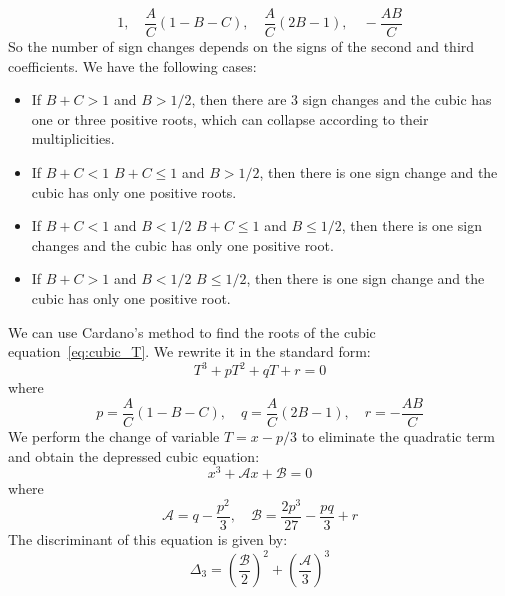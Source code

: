 \documentclass[a4paper, 12pt]{article}
\providecommand{\DIFaddtex}[1]{{\protect\color{blue} \sf #1}} %
\providecommand{\DIFdeltex}[1]{{\protect\color{red} \scriptsize #1}} %
\providecommand{\DIFaddbegin}{} %
\providecommand{\DIFaddend}{} %
\providecommand{\DIFdelbegin}{} %
\providecommand{\DIFdelend}{} %
\providecommand{\DIFadd}[1]{\texorpdfstring{\DIFaddtex{#1}}{#1}} %
\providecommand{\DIFdel}[1]{\texorpdfstring{\DIFdeltex{#1}}{}} %
\begin{document}
\[1, \quad \frac{A}{C} \left(1- B- C \right), \quad \frac{A}{C} \left(2 B -1 \right), \quad - \frac{A B}{C}   \]  
So the number of sign changes depends on the signs of the second and third coefficients.
We have the following cases:
\begin{itemize}
\item If $ B +C > 1$ and $B > 1/2$, then there are 3 sign changes and the cubic has one or three positive roots, which can collapse according to their multiplicities.
\item If \DIFdelbegin \DIFdel{$B +C  < 1$ }\DIFdelend \DIFaddbegin \DIFadd{$B +C  \leq 1$ }\DIFaddend and $B > 1/2 $, then there is one sign change and the cubic has only one positive roots.
\item If \DIFdelbegin \DIFdel{$B +C  < 1$ and $B < 1/2$}\DIFdelend \DIFaddbegin \DIFadd{$B +C  \leq  1$ and $B \leq 1/2$}\DIFaddend , then there is one sign changes and the cubic has only one positive root.
\item If $B +C  > 1$ and \DIFdelbegin \DIFdel{$B < 1/2$}\DIFdelend \DIFaddbegin \DIFadd{$B \leq 1/2$}\DIFaddend , then there is one sign change and the cubic has only one positive root.
\end{itemize}

\par\noindent We can use Cardano's method to find the roots of the cubic equation~\eqref{eq:cubic_T}. We rewrite it in the standard form:
\[ T^3 + p T^2 + q T + r = 0
\]
where
\[ p = \frac{A}{C} \left(1- B- C \right), \quad
q = \frac{A}{C} \left(2 B -1 \right), \quad
r = -\frac{A B}{C}
\]
We perform the change of variable $T = x - p/3$ to eliminate the quadratic term and obtain the depressed cubic equation:
\[
x^3 + \mathcal{A} x + \mathcal{B} = 0
\]
where
\[
\mathcal{A} = q - \frac{p^2}{3}, \quad \mathcal{B} = \frac{2 p^3}{27} - \frac{p q}{3} + r
\]
The discriminant of this equation is given by:
\[
\Delta_3 = {\left(\frac{\mathcal{B}}{2}\right)}^2 + {\left(\frac{\mathcal{A}}{3}\right)}^3
\]
\end{document}
